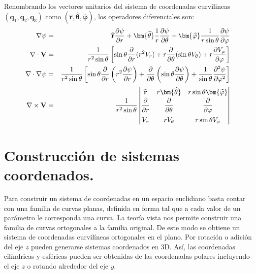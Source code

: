 \\
Renombrando los vectores unitarios del sistema de coordenadas curvilineas $(\mathbf{q}_{1}, \mathbf{q}_{2}, \mathbf{q}_{3}) $ como $(\mathbf{\widehat{r}}, \bm{\widehat{\theta}}, \bm{\widehat{\varphi}})$, los operadores diferenciales son:
\begin{eqnarray}
\nabla \psi &=& \mathbf{\widehat{r}} \dfrac{\partial \psi}{\partial r} + \bm{\widehat{\theta}} \dfrac{1}{r} \dfrac{\partial \psi}{\partial \theta} + \bm{\widehat{\varphi}} \dfrac{1}{r \sin \theta} \dfrac{\partial \psi}{\partial \varphi} \\
\mathbf{\nabla \cdot V} &=& \dfrac{1}{r^{2} \sin \theta} \left[ \sin \theta \dfrac{\partial}{\partial r}(r^{2} V_{r}) + r \dfrac{\partial}{\partial \theta} (\sin \theta V_{\theta}) + r \dfrac{\partial V_{\varphi}}{\partial \varphi} \right] \\
\mathbf{\nabla \cdot \nabla \psi} &=& \dfrac{1}{r^{2} \sin \theta} \left[  \sin \theta \dfrac{\partial}{\partial r} \left(  r^{2} \dfrac{\partial \psi}{\partial r} \right) + \dfrac{\partial}{\partial \theta} \left( \sin \theta \dfrac{\partial \psi}{\partial \theta} \right) + \dfrac{1}{\sin \theta} \dfrac{\partial^{2} \psi}{\partial \varphi^{2}}   \right] \\
\mathbf{\nabla \times V} &=& \dfrac{1}{r^{2} \sin \theta}
\renewcommand\arraystretch{1.5} \begin{vmatrix}
\mathbf{\widehat{r}} & r \bm{\widehat{\theta}} & r \sin \theta \bm{\widehat{\varphi}} \\
\dfrac{\partial}{\partial r} & \dfrac{\partial}{\partial \theta} & \dfrac{\partial}{\partial \varphi} \\
V_{r} & r V_{\theta} & r \sin \theta V_{\varphi}
\end{vmatrix}
\end{eqnarray}
\section{Construcción de sistemas coordenados.}
Para construir un sistema de coordenadas en un espacio euclidiano basta contar con una familia de curvas planas, definida en forma tal que a cada valor de un parámetro le corresponda una curva. La teoría vista nos permite construir una familia de curvas ortogonales a la familia original. De este modo se obtiene un sistema de coordenadas curvilíneas ortogonales en el plano. Por rotación o adición del eje $z$ pueden generarse sistemas coordenados en 3D. Así, las coordenadas cilíndricas y esféricas pueden ser obtenidas de las coordenadas polares incluyendo el eje $z$ o rotando alrededor del eje $y$.
